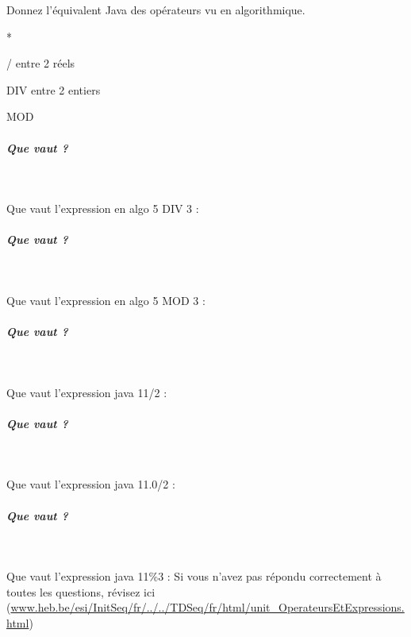 \documentclass[11pt,a4paper]{article}
\begin{document}
                  Donnez l'\'equivalent Java des op\'erateurs vu en algorithmique.
                
            \par
         
                *   \textcolor{gray}{\underline{\hspace*{1em}}} \par
				
                /   \textcolor{gray}{\underline{\hspace*{1em}}}  entre 2 r\'eels \par
				
                DIV   \textcolor{gray}{\underline{\hspace*{1em}}}  entre 2 entiers \par
				
                MOD   \textcolor{gray}{\underline{\hspace*{1em}}} \par
				
			
		\subparagraph{Que vaut ?} 
		
                \textcolor{white}{.} \par
            Que vaut l'expression en algo
                5 DIV 3 :  \textcolor{gray}{\underline{\hspace*{1em}}} 
			
		\subparagraph{Que vaut ?} 
		
                \textcolor{white}{.} \par
            Que vaut l'expression en algo
                5 MOD 3 :  \textcolor{gray}{\underline{\hspace*{1em}}} 
			
		\subparagraph{Que vaut ?} 
		
                \textcolor{white}{.} \par
            Que vaut l'expression java
                11/2 :  \textcolor{gray}{\underline{\hspace*{1em}}} 
			
		\subparagraph{Que vaut ?} 
		
                \textcolor{white}{.} \par
            Que vaut l'expression java
                11.0/2 :  \textcolor{gray}{\underline{\hspace*{2em}}} 
			
		\subparagraph{Que vaut ?} 
		
                \textcolor{white}{.} \par
            Que vaut l'expression java
                11\%3 :  \textcolor{gray}{\underline{\hspace*{1em}}} Si vous n'avez pas r\'epondu correctement \`a toutes les questions, 
          r\'evisez ici (\url{www.heb.be/esi/InitSeq/fr/../../TDSeq/fr/html/unit\_OperateursEtExpressions.html})
            \par
        
\end{document}
